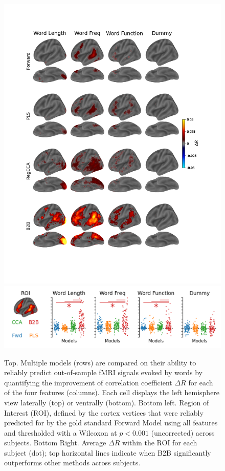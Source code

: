 \begin{figure}
  \begin{center}
          \includegraphics[width=.8\textwidth,
                       trim=1cm 1cm 1cm 2cm,
                       clip=True]{figures/fmri_delta_r.png}
          \includegraphics[width=.8\textwidth,
                       trim=0cm 0cm 0cm 0cm,
                       clip=True]{figures/fmri_strip.png}

      \label{fig:fmri_delta_r}
  \end{center}
  \caption{Top. Multiple models (rows) are compared on their ability to
  reliably predict out-of-sample fMRI signals evoked by words by quantifying
  the improvement of correlation coefficient $\Delta R$ for each of the four
  features (columns). Each cell displays the left hemisphere view laterally
  (top) or ventrally (bottom). Bottom left. Region
  of Interest (ROI), defined by the cortex vertices that were reliably
  predicted for by the gold standard Forward Model using all features and
  thresholded with a Wilcoxon at $p<0.001$ (uncorrected) across subjects. Bottom
  Right. Average $\Delta R$ within the ROI for each subject
  (dot); top horizontal lines indicate when B2B significantly outperforms
  other methods across subjects.}
\end{figure}


